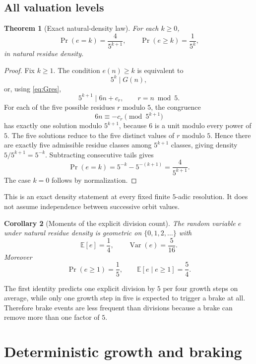 \documentclass[11pt]{article}
\newtheorem{theorem}{Theorem}[section]
\newtheorem{corollary}[theorem]{Corollary}
\theoremstyle{definition}
\begin{document}
\subsection{All valuation levels}

\begin{theorem}[Exact natural-density law]
For each $k\ge0$,
\begin{equation}
\Pr(e=k)=\frac{4}{5^{k+1}},
\qquad
\Pr(e\ge k)=\frac{1}{5^k},
\label{eq:geom}
\end{equation}
in natural residue density.
\end{theorem}

\begin{proof}
Fix $k\ge1$. The condition $e(n)\ge k$ is equivalent to
\[
5^k\mid G(n),
\]
or, using \eqref{eq:Gres},
\[
5^{k+1}\mid 6n+c_r,
\qquad r=n\bmod5.
\]
For each of the five possible residues $r$ modulo $5$, the congruence
\[
6n\equiv-c_r\pmod{5^{k+1}}
\]
has exactly one solution modulo $5^{k+1}$, because $6$ is a unit modulo every power of $5$. The five solutions reduce to the five distinct values of $r$ modulo $5$. Hence there are exactly five admissible residue classes among $5^{k+1}$ classes, giving density $5/5^{k+1}=5^{-k}$. Subtracting consecutive tails gives
\[
\Pr(e=k)=5^{-k}-5^{-(k+1)}=\frac4{5^{k+1}}.
\]
The case $k=0$ follows by normalization.
\end{proof}

This is an exact density statement at every fixed finite $5$-adic resolution. It does not assume independence between successive orbit values.

\begin{corollary}[Moments of the explicit division count]
The random variable $e$ under natural residue density is geometric on $\{0,1,2,\ldots\}$ with
\[
\mathbb E[e]=\frac14,\qquad
\operatorname{Var}(e)=\frac5{16}.
\]
Moreover
\[
\Pr(e\ge1)=\frac15,\qquad
\mathbb E[e\mid e\ge1]=\frac54.
\]
\end{corollary}

The first identity predicts one explicit division by $5$ per four growth steps on average, while only one growth step in five is expected to trigger a brake at all. Therefore brake events are less frequent than divisions because a brake can remove more than one factor of $5$.

\section{Deterministic growth and braking}
\end{document}
